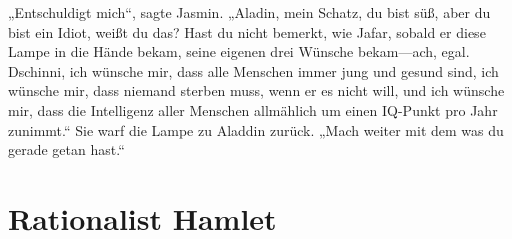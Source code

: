 „Entschuldigt mich“, sagte Jasmin. „Aladin, mein Schatz, du bist süß, aber du bist ein Idiot, weißt du das? Hast du nicht bemerkt, wie Jafar, sobald er diese Lampe in die Hände bekam, seine eigenen drei Wünsche bekam—ach, egal. Dschinni, ich wünsche mir, dass alle Menschen immer jung und gesund sind, ich wünsche mir, dass niemand sterben muss, wenn er es nicht will, und ich wünsche mir, dass die Intelligenz aller Menschen allmählich um einen IQ-Punkt pro Jahr zunimmt.“ Sie warf die Lampe zu Aladdin zurück. „Mach weiter mit dem was du gerade getan hast.“

\section{Rationalist Hamlet\protect\footnotemark}%

